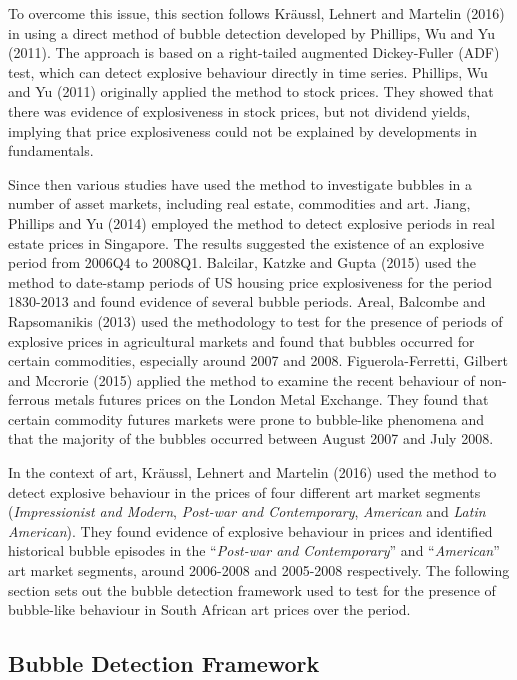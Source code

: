 \documentclass[12pt,]{article}
\begin{document}
To overcome this issue, this section follows Kräussl, Lehnert and
Martelin (2016) in using a direct method of bubble detection developed
by Phillips, Wu and Yu (2011). The approach is based on a right-tailed
augmented Dickey-Fuller (ADF) test, which can detect explosive behaviour
directly in time series. Phillips, Wu and Yu (2011) originally applied
the method to stock prices. They showed that there was evidence of
explosiveness in stock prices, but not dividend yields, implying that
price explosiveness could not be explained by developments in
fundamentals.

Since then various studies have used the method to investigate bubbles
in a number of asset markets, including real estate, commodities and
art. Jiang, Phillips and Yu (2014) employed the method to detect
explosive periods in real estate prices in Singapore. The results
suggested the existence of an explosive period from 2006Q4 to 2008Q1.
Balcilar, Katzke and Gupta (2015) used the method to date-stamp periods
of US housing price explosiveness for the period 1830-2013 and found
evidence of several bubble periods. Areal, Balcombe and Rapsomanikis
(2013) used the methodology to test for the presence of periods of
explosive prices in agricultural markets and found that bubbles occurred
for certain commodities, especially around 2007 and 2008.
Figuerola-Ferretti, Gilbert and Mccrorie (2015) applied the method to
examine the recent behaviour of non-ferrous metals futures prices on the
London Metal Exchange. They found that certain commodity futures markets
were prone to bubble-like phenomena and that the majority of the bubbles
occurred between August 2007 and July 2008.

In the context of art, Kräussl, Lehnert and Martelin (2016) used the
method to detect explosive behaviour in the prices of four different art
market segments (\emph{Impressionist and Modern}, \emph{Post-war and
Contemporary}, \emph{American} and \emph{Latin American}). They found
evidence of explosive behaviour in prices and identified historical
bubble episodes in the ``\emph{Post-war and Contemporary}'' and
``\emph{American}'' art market segments, around 2006-2008 and 2005-2008
respectively. The following section sets out the bubble detection
framework used to test for the presence of bubble-like behaviour in
South African art prices over the period.

\subsection{Bubble Detection
Framework}\label{bubble-detection-framework}
\end{document}
